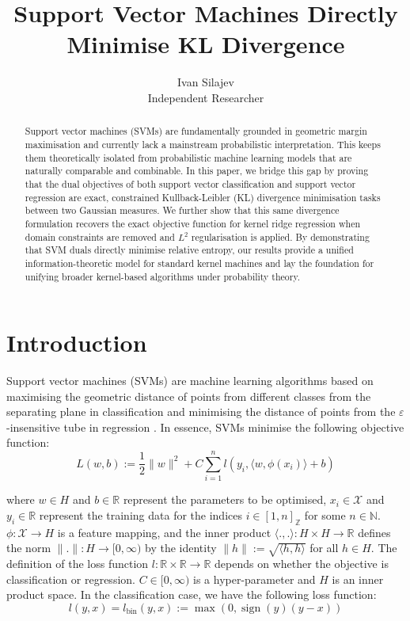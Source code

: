 \documentclass{article}
\title{Support Vector Machines Directly Minimise KL Divergence}
\author{Ivan Silajev \\Independent Researcher}
\begin{document}
\maketitle

\begin{abstract}
Support vector machines (SVMs) are fundamentally grounded in geometric margin maximisation and currently lack a mainstream probabilistic interpretation. This keeps them theoretically isolated from probabilistic machine learning models that are naturally comparable and combinable. In this paper, we bridge this gap by proving that the dual objectives of both support vector classification and support vector regression are exact, constrained Kullback-Leibler (KL) divergence minimisation tasks between two Gaussian measures. We further show that this same divergence formulation recovers the exact objective function for kernel ridge regression when domain constraints are removed and $L^2$ regularisation is applied. By demonstrating that SVM duals directly minimise relative entropy, our results provide a unified information-theoretic model for standard kernel machines and lay the foundation for unifying broader kernel-based algorithms under probability theory.
\end{abstract}

\section{Introduction}\label{introduction}

Support vector machines (SVMs) are machine learning algorithms based on maximising the geometric distance of points from different classes from the separating plane in classification and minimising the distance of points from the $\varepsilon$-insensitive tube in regression \cite[Section 3]{KernelMethodsInML}. In essence, SVMs minimise the following objective function:
\begin{equation}
L(w, b) := \dfrac{1}{2} \|w\|^2 + C \sum_{i=1}^n l(y_i, \langle w, \phi(x_i) \rangle + b)
\end{equation}

where $w \in H$ and $b \in \mathbb{R}$ represent the parameters to be optimised, $x_i \in \mathcal{X}$ and $y_i \in \mathbb{R}$ represent the training data for the indices $i \in [1 , n]_{\mathbb{Z}}$ for some $n \in \mathbb{N}$. $\phi : \mathcal{X} \rightarrow H$ is a feature mapping, and the inner product $\langle . , .\rangle : H \times H \rightarrow \mathbb{R}$ defines the norm $\| .\| : H \rightarrow [0 ,\infty)$ by the identity $\| h\| := \sqrt{\langle h,h \rangle}$ for all $h \in H$. The definition of the loss function $l : \mathbb{R} \times \mathbb{R} \rightarrow \mathbb{R}$ depends on whether the objective is classification or regression. $C \in [0 ,\infty)$ is a hyper-parameter and $H$ is an inner product space. In the classification case, we have the following loss function:
\begin{equation}\label{svm-classification}
l(y, x) = l_{\text{bin}}(y, x) := \max(0, \operatorname{sign}(y)(y - x))
\end{equation}
\end{document}
